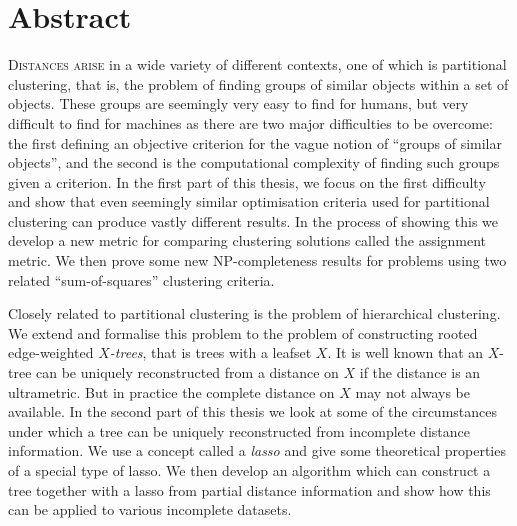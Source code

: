 \chapter*{\centering Abstract}

\textsc{Distances arise} in a wide variety of different contexts, one of which
is partitional clustering, that is, the problem of finding groups of similar
objects within a set of objects.  These groups are seemingly very easy to find
for humans, but very difficult to find for machines as there are two major
difficulties to be overcome: the first defining an objective criterion for the
vague notion of ``groups of similar objects'', and the second is the
computational complexity of finding such groups given a criterion.  In the
first part of this thesis, we focus on the first difficulty and show that even
seemingly similar optimisation criteria used for partitional clustering can
produce vastly different results.  In the process of showing this we develop a
new metric for comparing clustering solutions called the assignment metric.
We then prove some new NP-completeness results for problems using two related
``sum-of-squares'' clustering criteria.

Closely related to partitional clustering is the problem of hierarchical
clustering.  We extend and formalise this problem to the problem of
constructing rooted edge-weighted \textit{$X$-trees}, that is trees with a
leafset $X$. It is well known that an $X$-tree can be uniquely reconstructed
from a distance on $X$ if the distance is an ultrametric.  But in practice the
complete distance on $X$ may not always be available.  In the second part of
this thesis we look at some of the circumstances under which a tree can be
uniquely reconstructed from incomplete distance information.  We use a concept
called a \textit{lasso} and give some theoretical properties of a special type
of lasso.  We then develop an algorithm which can construct a tree together
with a lasso from partial distance information and show how this can be
applied to various incomplete datasets.
